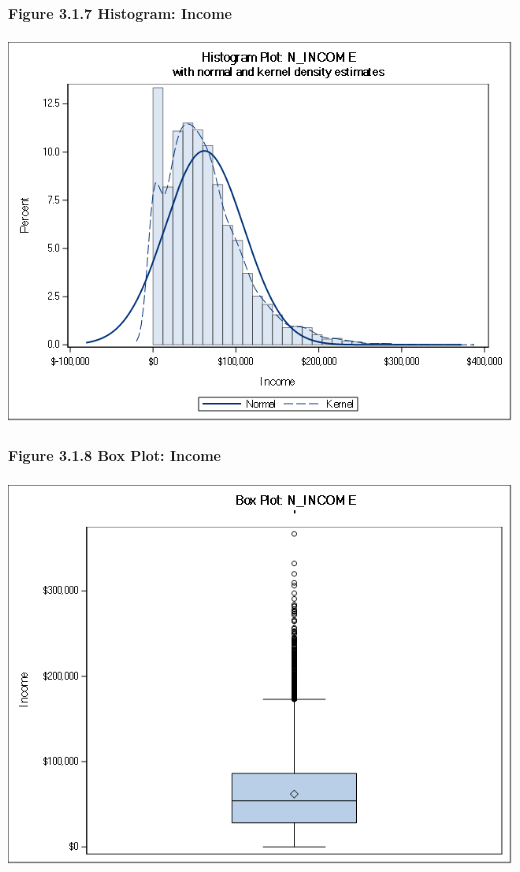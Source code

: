 \documentclass[]{article}
\let\oldparagraph\paragraph
\renewcommand{\paragraph}[1]{\oldparagraph{#1}\mbox{}}
\begin{document}
\newpage

\paragraph{Figure 3.1.7 Histogram:
Income}\label{figure-3.1.7-histogram-income}

\includegraphics[height=3.95833in]{images/hist_income.png}

\paragraph{Figure 3.1.8 Box Plot:
Income}\label{figure-3.1.8-box-plot-income}

\includegraphics[height=3.95833in]{images/box_income.png}
\end{document}
